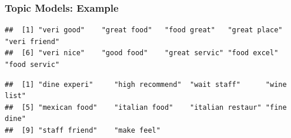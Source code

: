 \documentclass[
  shownotes,
  xcolor={svgnames},
  hyperref={colorlinks,citecolor=DarkBlue,linkcolor=DarkRed,urlcolor=DarkBlue}
  , aspectratio=169]{beamer}
\newenvironment{Shaded}{\begin{snugshade}}{\end{snugshade}}
\newcommand{\CommentTok}[1]{\textcolor[rgb]{0.56,0.35,0.01}{\textit{#1}}}
\newcommand{\DataTypeTok}[1]{\textcolor[rgb]{0.13,0.29,0.53}{#1}}
\newcommand{\DecValTok}[1]{\textcolor[rgb]{0.00,0.00,0.81}{#1}}
\newcommand{\KeywordTok}[1]{\textcolor[rgb]{0.13,0.29,0.53}{\textbf{#1}}}
\newcommand{\NormalTok}[1]{#1}
\newcommand{\OperatorTok}[1]{\textcolor[rgb]{0.81,0.36,0.00}{\textbf{#1}}}
\newcommand{\OtherTok}[1]{\textcolor[rgb]{0.56,0.35,0.01}{#1}}
\begin{document}
\begin{frame}[fragile]
\frametitle{Topic Models: Example}
\begin{scriptsize}


\begin{Shaded}
\end{Shaded}

\end{scriptsize}
\begin{tiny}



\begin{verbatim}
##  [1] "veri good"    "great food"   "food great"   "great place"  "veri friend" 
##  [6] "veri nice"    "good food"    "great servic" "food excel"   "food servic"
\end{verbatim}
\end{tiny}
\begin{scriptsize}


\begin{Shaded}
\end{Shaded}
\end{scriptsize}
\begin{tiny}


\begin{verbatim}
##  [1] "dine experi"     "high recommend"  "wait staff"      "wine list"      
##  [5] "mexican food"    "italian food"    "italian restaur" "fine dine"      
##  [9] "staff friend"    "make feel"
\end{verbatim}
\end{tiny}
\end{frame}
\end{document}
